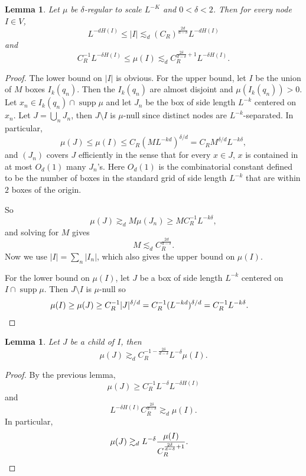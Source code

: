 \documentclass[reqno,10pt]{amsart}
\DeclareMathOperator{\supp}{supp}
\newtheorem{lemma}[theorem]{Lemma}
\theoremstyle{definition}
\numberwithin{equation}{section}
\begin{document}
\begin{lemma}
Let $\mu$ be $\delta$-regular to scale $L^{-K}$ and $0 < \delta < 2$. Then for every node $I \in V$,
$$L^{-dH(I)} \leq |I| \lesssim_d (C_R)^{\frac{2d}{d - \delta}} L^{-dH(I)}$$
and 
$$C_R^{-1} L^{-\delta H(I)} \leq \mu(I) \lesssim_d C_R^{\frac{2\delta}{d - \delta} + 1} L^{-\delta H(I)}.$$
\end{lemma}
\begin{proof}
The lower bound on $|I|$ is obvious. For the upper bound, let $I$ be the union of $M$ boxes $I_k(q_n)$.
Then the $I_k(q_n)$ are almost disjoint and $\mu(I_k(q_n)) > 0$.
Let $x_n \in I_k(q_n) \cap \supp \mu$ and let $J_n$ be the box of side length $L^{-k}$ centered on $x_n$.
Let $J = \bigcup_n J_n$, then $J \setminus I$ is $\mu$-null since distinct nodes are $L^{-k}$-separated. In particular,
$$\mu(J) \leq \mu(I) \leq C_R (ML^{-kd})^{\delta/d} = C_R M^{\delta/d} L^{-k\delta},$$
and $(J_n)$ covers $J$ efficiently in the sense that for every $x \in J$, $x$ is contained in at most $O_d(1)$ many $J_n$'s.
Here $O_d(1)$ is the combinatorial constant defined to be the number of boxes in the standard grid of side length $L^{-k}$ that are within $2$ boxes of the origin.

So
$$\mu(J) \gtrsim_d M\mu(J_n) \geq MC_R^{-1}L^{-k\delta},$$
and solving for $M$ gives 
$$M \lesssim_d C_R^{\frac{2d}{d - \delta}}.$$
Now we use $|I| = \sum_n |I_n|$, which also gives the upper bound on $\mu(I)$.

For the lower bound on $\mu(I)$, let $J$ be a box of side length $L^{-k}$ centered on $I \cap \supp \mu$.
Then $J \setminus I$ is $\mu$-null so 
\begin{align*}
\mu(I) &\geq \mu(J) \geq C_R^{-1} |J|^{\delta/d} = C_R^{-1} (L^{-kd})^{\delta/d} = C_R^{-1} L^{-k\delta}. \qedhere 
\end{align*}
\end{proof}

\begin{lemma}
Let $J$ be a child of $I$, then 
$$\mu(J) \gtrsim_d C_R^{-1 - \frac{2\delta}{d - \delta}} L^{-\delta} \mu(I).$$
\end{lemma}
\begin{proof}
By the previous lemma, 
$$\mu(J) \geq C_R^{-1} L^{-\delta} L^{-\delta H(I)}$$
and 
$$L^{-\delta H(I)} C_R^{\frac{2\delta}{d - \delta}} \gtrsim_d \mu(I).$$
In particular, 
\begin{align*}
\mu(J) &\gtrsim_d L^{-\delta} \frac{\mu(I)}{C_R^{\frac{2\delta}{d - \delta} + 1}}. \qedhere 
\end{align*}
\end{proof}
\end{document}
